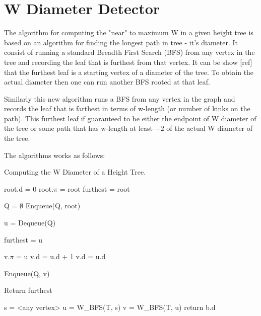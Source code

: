 \section{W Diameter Detector}


The algorithm for computing the "near" to maximum W in a given height tree is based on an algorithm for finding the longest path in tree - it's diameter. It consist of running a standard Breadth First Search (BFS) from any vertex in the tree and recording the leaf that is furthest from that vertex. It can be show [ref] that the furthest leaf is a starting vertex of a diameter of the tree. To obtain the actual diameter then one can run another BFS rooted at that leaf.

Similarly this new algorithm runs a BFS from any vertex in the graph and records the leaf that is farthest in terms of w-length (or number of kinks on the path). This furthest leaf if guaranteed to be either the endpoint of W diameter of the tree or some path that has w-length at least $-2$ of the actual W diameter of the tree. 

The algorithms works as follows:


\begin{algorithm}
\caption{Computing the W Diameter of a Height Tree.}

\begin{algorithmic}[1]

    \State root.d = 0
    \State root.$\pi$ = root
    \State furthest = root

    \State Q = $\emptyset$
    \State Enqueue(Q, root)

        \State u = Dequeue(Q)

            \State furthest = u
        \EndIf

                \State v.$\pi$ = u
                    \State v.d = u.d + 1
                \Else
                    \State v.d = u.d
                \EndIf

                \State Enqueue(Q, v)

            \EndIf
        \EndFor
    \EndWhile
    \State Return furthest
\EndFunction

    \State s = <any vertex>
    \State u = W\_BFS(T, s)
    \State v = W\_BFS(T, u)
    \State return b.d
\EndFunction

\end{algorithmic}
\end{algorithm}

